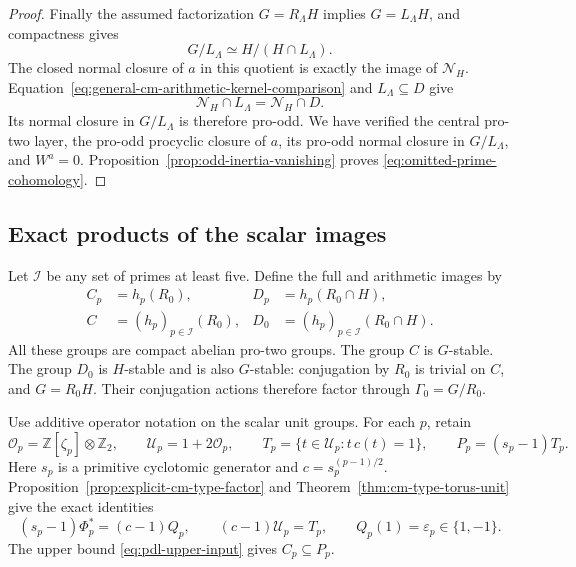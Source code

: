 \begin{proof}
Finally the assumed factorization \(G=R_\Lambda H\)
implies \(G=L_\Lambda H\), and compactness gives
\[
                      G/L_\Lambda\simeq H/(H\cap L_\Lambda).
\]
The closed normal closure of \(a\) in this quotient
is exactly the image of \(\mathscr N_H\).
Equation~\eqref{eq:general-cm-arithmetic-kernel-comparison}
and \(L_\Lambda\subseteq D\) give
\[
                   \mathscr N_H\cap L_\Lambda=\mathscr N_H\cap D.
\]
Its normal closure in \(G/L_\Lambda\) is therefore
pro-odd. We have verified the central pro-two layer,
the pro-odd procyclic closure of \(a\), its pro-odd
normal closure in \(G/L_\Lambda\), and \(W^a=0\).
Proposition~\ref{prop:odd-inertia-vanishing} proves
\eqref{eq:omitted-prime-cohomology}.
\end{proof}

\subsection{Exact products of the scalar images}

Let \(\mathcal I\) be any set of primes at least five.
Define the full and arithmetic images by
\begin{equation}
 \begin{aligned}
 C_p&=h_p(R_0),&
 D_p&=h_p(R_0\cap H),\\
 C&=(h_p)_{p\in\mathcal I}(R_0),&
 D_0&=(h_p)_{p\in\mathcal I}(R_0\cap H).
 \end{aligned}
 \label{eq:all-cm-scalar-images}
\end{equation}
All these groups are compact abelian pro-two groups.
The group \(C\) is \(G\)-stable.
The group \(D_0\) is \(H\)-stable and is also \(G\)-stable:
conjugation by \(R_0\) is trivial on \(C\), and \(G=R_0H\).
Their conjugation actions therefore factor through
\(\Gamma_0=G/R_0\).

Use additive operator notation on the scalar unit groups.
For each \(p\), retain
\[
 \mathcal O_p=\mathbb Z[\zeta_p]\otimes\mathbb Z_2,\qquad
 \mathcal U_p=1+2\mathcal O_p,\qquad
 T_p=\{t\in\mathcal U_p:t\,c(t)=1\},\qquad P_p=(s_p-1)T_p.
\]
Here \(s_p\) is a primitive cyclotomic generator and
\(c=s_p^{(p-1)/2}\).
Proposition~\ref{prop:explicit-cm-type-factor} and
Theorem~\ref{thm:cm-type-torus-unit} give the exact identities
\begin{equation}
 (s_p-1)\Phi_p^*=(c-1)Q_p,\qquad
 (c-1)\mathcal U_p=T_p,\qquad
 Q_p(1)=\varepsilon_p\in\{1,-1\}.
 \label{eq:all-cm-integral-operator-inputs}
\end{equation}
The upper bound \eqref{eq:pdl-upper-input} gives
\(C_p\subseteq P_p\).

